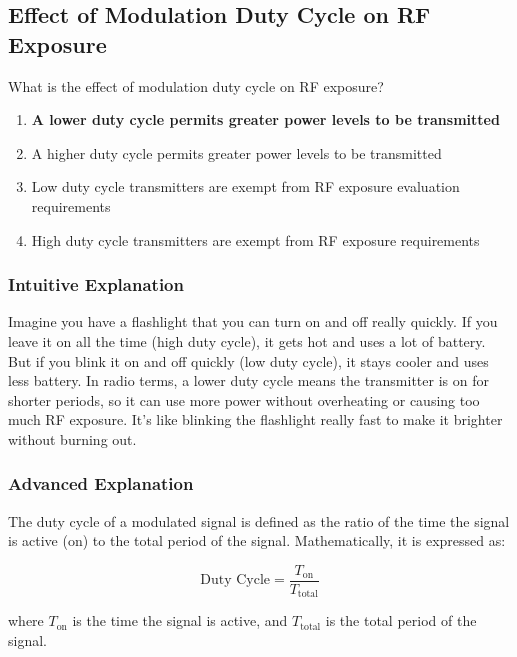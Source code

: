 \subsection{Effect of Modulation Duty Cycle on RF Exposure}
\label{G0A07}

\begin{tcolorbox}[colback=gray!10!white,colframe=black!75!black,title=G0A07]
What is the effect of modulation duty cycle on RF exposure?
\begin{enumerate}[label=\Alph*,noitemsep]
    \item \textbf{A lower duty cycle permits greater power levels to be transmitted}
    \item A higher duty cycle permits greater power levels to be transmitted
    \item Low duty cycle transmitters are exempt from RF exposure evaluation requirements
    \item High duty cycle transmitters are exempt from RF exposure requirements
\end{enumerate}
\end{tcolorbox}

\subsubsection{Intuitive Explanation}
Imagine you have a flashlight that you can turn on and off really quickly. If you leave it on all the time (high duty cycle), it gets hot and uses a lot of battery. But if you blink it on and off quickly (low duty cycle), it stays cooler and uses less battery. In radio terms, a lower duty cycle means the transmitter is on for shorter periods, so it can use more power without overheating or causing too much RF exposure. It's like blinking the flashlight really fast to make it brighter without burning out.

\subsubsection{Advanced Explanation}
The duty cycle of a modulated signal is defined as the ratio of the time the signal is active (on) to the total period of the signal. Mathematically, it is expressed as:

\[
\text{Duty Cycle} = \frac{T_{\text{on}}}{T_{\text{total}}}
\]

where \( T_{\text{on}} \) is the time the signal is active, and \( T_{\text{total}} \) is the total period of the signal.

